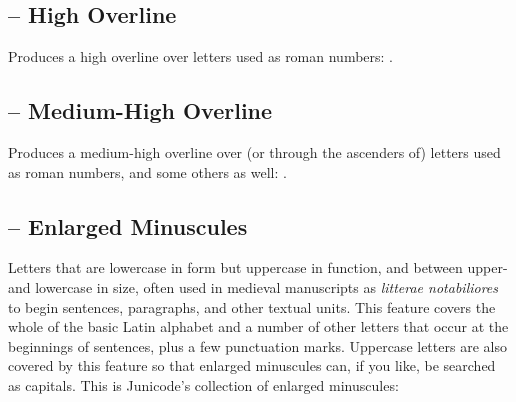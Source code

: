 \subsection{ – High
Overline}
Produces a high overline over letters used as roman numbers: .

\subsection{ –
Medium-High Overline}
Produces a medium-high overline over (or through the ascenders of) letters used as roman numbers, and some others as
well: .

\subsection{ –
Enlarged Minuscules}\hypertarget{ss06}{}
Letters that are lowercase in form but uppercase in function, and between upper- and
lowercase in size, often used in medieval manuscripts as \textit{litterae notabiliores} to begin sentences,
paragraphs, and other textual units.
This feature
covers the whole of the basic Latin alphabet and a number of other letters that
occur at the beginnings of sentences, plus a few punctuation marks.
Uppercase letters are also covered by this feature so that enlarged minuscules
can, if you like, be searched as capitals. This is Junicode's collection of
enlarged minuscules:

